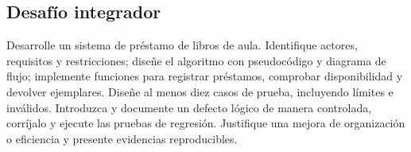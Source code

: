 \subsection{Desafío integrador}

Desarrolle un sistema de préstamo de libros de aula. Identifique actores, requisitos y restricciones; diseñe el algoritmo con pseudocódigo y diagrama de flujo; implemente funciones para registrar préstamos, comprobar disponibilidad y devolver ejemplares. Diseñe al menos diez casos de prueba, incluyendo límites e inválidos. Introduzca y documente un defecto lógico de manera controlada, corríjalo y ejecute las pruebas de regresión. Justifique una mejora de organización o eficiencia y presente evidencias reproducibles.

